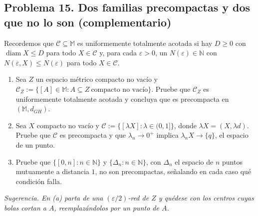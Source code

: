 \documentclass[11pt,a4paper]{article}
\begin{document}
\subsection*{\hypertarget{prob-15}{}Problema 15. Dos familias precompactas y dos que no lo son {\normalfont\small(complementario)}}
Recordemos que $\mathcal C\subseteq\mathbb M$ es uniformemente totalmente acotada si hay $D\ge0$ con $\operatorname{diam} X\le D$ para todo $X\in\mathcal C$ y, para cada $\varepsilon\gt 0$, un $N(\varepsilon)\in\mathbb{N}$ con $N(\varepsilon,X)\le N(\varepsilon)$ para todo $X\in\mathcal C$.
\begin{enumerate}[label=(\alph*),leftmargin=2.2em,itemsep=2pt]
\item[(a)] Sea $Z$ un espacio métrico compacto no vacío y $\mathcal C_Z:=\{[A]\in\mathbb M: A\subseteq Z\ \text{compacto no vacío}\}$. Pruebe que $\mathcal C_Z$ es uniformemente totalmente acotada y concluya que es precompacta en $(\mathbb M,d_{GH})$.
\item[(b)] Sea $X$ compacto no vacío y $\mathcal C:=\{[\lambda X]:\lambda\in(0,1]\}$, donde $\lambda X=(X,\lambda d)$. Pruebe que $\mathcal C$ es precompacta y que $\lambda_n\to0^{+}$ implica $\lambda_nX\to\{q\}$, el espacio de un punto.
\item[(c)] Pruebe que $\{[0,n]:n\in\mathbb{N}\}$ y $\{\Delta_n:n\in\mathbb{N}\}$, con $\Delta_n$ el espacio de $n$ puntos mutuamente a distancia $1$, no son precompactas, señalando en cada caso qué condición falla.
\end{enumerate}
{\small\itshape Sugerencia. En (a) parta de una $(\varepsilon/2)$-red de $Z$ y quédese con los centros cuyas bolas cortan a $A$, reemplazándolos por un punto de $A$.}
\end{document}
